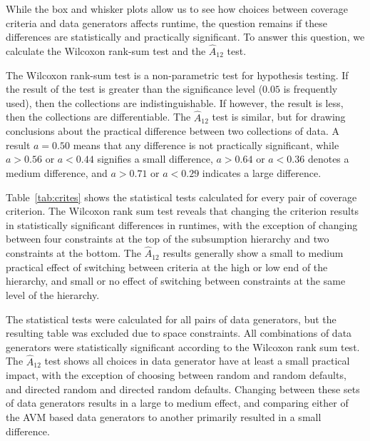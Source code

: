 
While the box and whisker plots allow us to see how choices between coverage criteria and data generators affects
runtime, the question remains if these differences are statistically and practically significant. To answer this
question, we calculate the Wilcoxon rank-sum test and the $\hat{A}_{12}$ test.

The Wilcoxon rank-sum test is a non-parametric test for hypothesis testing.  If the result of the test is greater than
the significance level ($0.05$ is frequently used), then the collections are indistinguishable.  If however, the result
is less, then the collections are differentiable.  The $\hat{A}_{12}$ test is similar, but for drawing conclusions about
the practical difference between two collections of data.  A result
$a=0.50$ means that any difference is not practically
significant, while $a>0.56$ or $a<0.44$ signifies a small difference, $a>0.64$ or $a<0.36$ denotes a medium difference,
and $a>0.71$ or $a<0.29$ indicates a large difference.

Table~\ref{tab:crites} shows the statistical tests calculated for every
pair of coverage criterion. The Wilcoxon rank sum test reveals that changing the criterion results in statistically significant differences in runtimes,
with the exception of changing between four constraints at the top of
the subsumption hierarchy and two constraints at
the bottom.  The $\hat{A}_{12}$ results generally show a small to medium practical effect of switching between criteria
at the high or low end of the hierarchy, and small or no effect of switching between constraints at the same level of the
hierarchy.

The statistical tests were calculated for all pairs of data generators,
but the resulting table was excluded due to space constraints. All
combinations of data generators were statistically significant according
to the Wilcoxon rank sum test. The $\hat{A}_{12}$ test shows all choices in
data generator have at least a small practical impact, with the exception of
choosing between random and random defaults, and directed random and
directed random defaults.  Changing between these
sets of data generators results in a large to medium effect, and
comparing either of the AVM based data generators to another
primarily resulted in a small difference.
